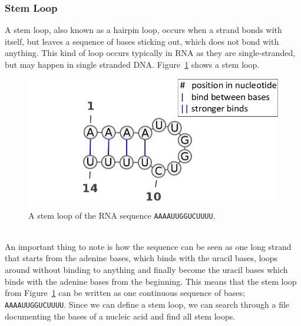 \subsubsection{Stem Loop}
A stem loop, also known as a hairpin loop, occurs when a strand bonds with 
itself, but leaves a sequence of bases sticking out, which does not bond with anything. 
This kind of loop occurs typically in RNA as they are single-stranded, but may 
happen in single stranded DNA. Figure~\ref{fig:stem-loop} 
shows a stem loop.
\begin{figure}[h!]\centering
\includegraphics[scale=0.35]{./lib/stem-loop.png}
\caption{A stem loop of the RNA sequence {\tt AAAAUUGGUCUUUU}.}
\label{fig:stem-loop}
\end{figure}\\
An important thing to note is how the sequence can be seen as one 
long strand that starts from the adenine bases, which binds with the uracil bases, 
loops around without binding to anything and finally become the uracil bases 
which binds with the adenine bases from the beginning. This means that the 
stem loop from Figure~\ref{fig:stem-loop} can be written as one continuous 
sequence of bases; {\tt AAAAUUGGUCUUUU}. Since we can define a stem loop, we can 
search through a file documenting the bases of a nucleic acid and find all stem 
loops.
